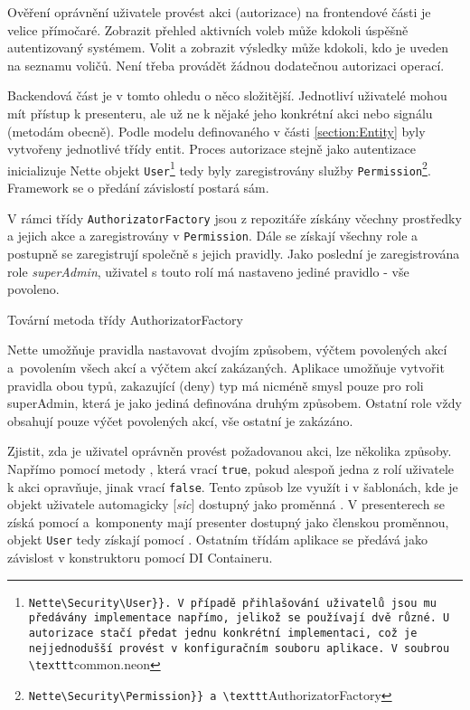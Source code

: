 Ověření oprávnění uživatele provést akci (autorizace) na frontendové části je velice přímočaré. Zobrazit přehled aktivních voleb může kdokoli úspěšně autentizovaný systémem. Volit a zobrazit výsledky může kdokoli, kdo je uveden na seznamu voličů. Není třeba provádět žádnou dodatečnou autorizaci operací.

Backendová část je v tomto ohledu o něco složitější. Jednotliví uživatelé mohou mít přístup k presenteru, ale už ne k nějaké jeho konkrétní akci nebo signálu (metodám obecně). Podle modelu definovaného v části \ref{section:Entity} byly vytvořeny jednotlivé třídy entit. Proces autorizace stejně jako autentizace inicializuje Nette objekt \texttt{User}\footnote{\label{user}\Verb{Nette\Security\User}}. V případě přihlašování uživatelů jsou mu předávány implementace napřímo, jelikož se používají dvě různé. U autorizace stačí předat jednu konkrétní implementaci, což je nejjednodušší provést v konfiguračním souboru aplikace. V soubrou \texttt{common.neon} tedy byly zaregistrovány služby \texttt{Permission}\footnote{\Verb{Nette\Security\Permission}} a \texttt{AuthorizatorFactory}. Framework se o předání závislostí postará sám.

V rámci třídy \texttt{AuthorizatorFactory} jsou z repozitáře získány včechny prostředky a jejich akce a zaregistrovány v \texttt{Permission}. Dále se získají všechny role a postupně se zaregistrují společně s jejich pravidly. Jako poslední je zaregistrována role \textit{superAdmin}, uživatel s touto rolí má nastaveno jediné pravidlo - vše povoleno. 

\begin{listing}[ht]
\caption{Tovární metoda třídy AuthorizatorFactory}
\label{php:autorizace}
\end{listing}

Nette umožňuje pravidla nastavovat dvojím způsobem, výčtem povolených akcí a~povolením všech akcí a výčtem akcí zakázaných. Aplikace umožňuje vytvořit pravidla obou typů, zakazující (deny) typ má nicméně smysl pouze pro roli superAdmin, která je jako jediná definována druhým způsobem. Ostatní role vždy obsahují pouze výčet povolených akcí, vše ostatní je zakázáno.

Zjistit, zda je uživatel oprávněn provést požadovanou akci, lze několika způsoby. Napřímo pomocí metody , která vrací \texttt{true}, pokud alespoň jedna z rolí uživatele k akci opravňuje, jinak vrací \texttt{false}. Tento způsob lze využít i v šablonách, kde je objekt uživatele automagicky [\textit{sic}] dostupný jako proměnná %
. V presenterech se získá pomocí  %
 a~komponenty mají presenter dostupný jako členskou proměnnou, objekt \texttt{User} tedy získají pomocí %
. Ostatním třídám aplikace se předává jako závislost v konstruktoru pomocí DI Containeru.

